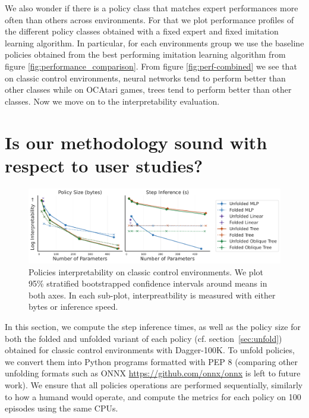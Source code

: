 We also wonder if there is a policy class that matches expert performances more often than others across environments.
For that we plot performance profiles of the different policy classes obtained with a fixed expert and fixed imitation learning algorithm.
In particular, for each environments group we use the baseline policies obtained from the best performing imitation learning algorithm from figure \ref{fig:performance_comparison}.
From figure \ref{fig:perf-combined} we see that on classic control environments, neural networks tend to perform better than other classes while on OCAtari games, trees tend to perform better than other classes.
Now we move on to the interpretability evaluation.

\section{Is our methodology sound with respect to user studies?}

\begin{figure}
    \centering
    \includegraphics[width=1\linewidth]{images/images_part3/tree_sizes_memory_ppo_ci_ablation.pdf}
    \caption{Policies interpretability on classic control environments. We plot 95\% stratified bootstrapped confidence intervals around means in both axes. In each sub-plot, interpreatbility is measured with either bytes or inference speed.}
    \label{fig:abl-proxies}
\end{figure}

In this section, we compute the step inference times, as well as the policy size for both the folded and unfolded variant of each policy (cf. section~\ref{sec:unfold}) obtained for classic control environments with Dagger-100K.
To unfold policies, we convert them into Python programs formatted with PEP 8 (comparing other unfolding formats such as ONNX \url{https://github.com/onnx/onnx} is left to future work).
We ensure that all policies operations are performed sequentially, similarly to how a humand would operate, and compute the metrics for each policy on 100 episodes using the same CPUs.

